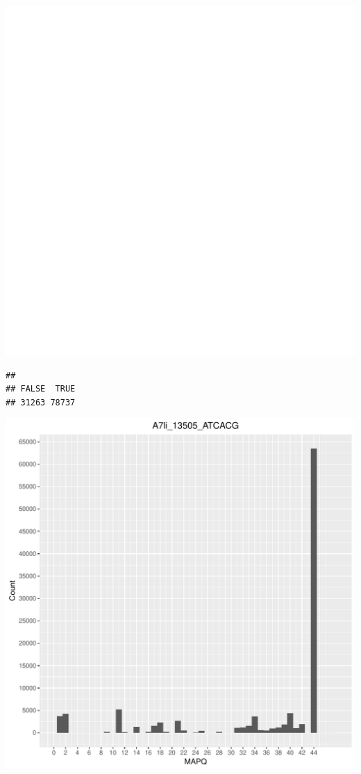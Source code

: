 \documentclass[12pt, a4paper]{article}\usepackage[]{graphicx}\usepackage[]{color}
\makeatletter
\def\maxwidth{ %
  \ifdim\Gin@nat@width>\linewidth
    \linewidth
  \else
    \Gin@nat@width
  \fi
}
\newenvironment{kframe}{%
 \def\at@end@of@kframe{}%
 \ifinner\ifhmode%
  \def\at@end@of@kframe{\end{minipage}}%
  \begin{minipage}{\columnwidth}%
 \fi\fi%
 \def\FrameCommand##1{\hskip\@totalleftmargin \hskip-\fboxsep
 \colorbox{shadecolor}{##1}\hskip-\fboxsep
     \hskip-\linewidth \hskip-\@totalleftmargin \hskip\columnwidth}%
 \MakeFramed {\advance\hsize-\width
   \@totalleftmargin\z@ \linewidth\hsize
   \@setminipage}}%
 {\par\unskip\endMakeFramed%
 \at@end@of@kframe}
\newenvironment{knitrout}{}{} %
\makeatother
\begin{document}
\begin{knitrout}
\includegraphics[width=\maxwidth]{figure/unnamed-chunk-3-22} 
\begin{kframe}\begin{verbatim}
## 
## FALSE  TRUE 
## 31263 78737
\end{verbatim}
\end{kframe}
\includegraphics[width=\maxwidth]{figure/unnamed-chunk-3-23} 


\end{knitrout}
\end{document}
